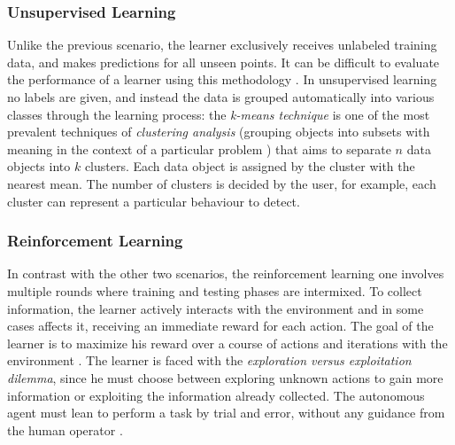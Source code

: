
\subsubsection{Unsupervised Learning}
\label{subsubsec:unsupervised-learning}

Unlike the previous scenario, the learner exclusively receives unlabeled training data, and makes predictions for all unseen points. It can be difficult to evaluate the performance of a learner using this methodology \cite[p. 6]{Mohri2018}. In unsupervised learning no labels are given, and instead the data is grouped automatically into various classes through the learning process: the \textit{k-means technique} is one of the most prevalent techniques of \textit{clustering analysis} (grouping objects into subsets with meaning in the context of a particular problem \cite{Annachhatre2015}) that aims to separate $n$ data objects into $k$ clusters. Each data object is assigned by the cluster with the nearest mean. The number of clusters is decided by the user, for example, each cluster can represent a particular behaviour to detect.


\subsubsection{Reinforcement Learning}
\label{subsubsec:reinforcement-learning}

In contrast with the other two scenarios, the reinforcement learning one involves multiple rounds where training and testing phases are intermixed. To collect information, the learner actively interacts with the environment and in some cases affects it, receiving an immediate reward for each action. The goal of the learner is to maximize his reward over a course of actions and iterations with the environment \cite[p. 7]{Mohri2018}. The learner is faced with the \textit{exploration versus exploitation dilemma}, since he must choose between exploring unknown actions to gain more information or exploiting the information already collected. The autonomous agent must lean to perform a task by trial and error, without any guidance from the human operator \cite[p. 25]{Goodfellow2016}.

